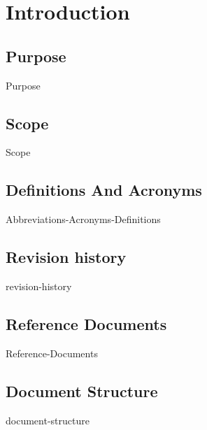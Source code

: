 \section{Introduction}

\subsection{Purpose}
{Purpose}

\subsection{Scope}
{Scope}

\subsection{Definitions And Acronyms}
{Abbreviations-Acronyms-Definitions}


\subsection{Revision history}
{revision-history}

\subsection{Reference Documents}
{Reference-Documents}

\subsection{Document Structure}
{document-structure}
